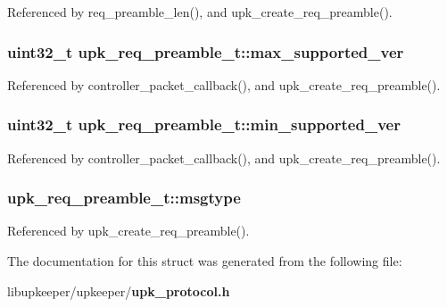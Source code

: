 Referenced by req\_\-preamble\_\-len(), and upk\_\-create\_\-req\_\-preamble().

\subsubsection[{max\_\-supported\_\-ver}]{\setlength{\rightskip}{0pt plus 5cm}uint32\_\-t {\bf upk\_\-req\_\-preamble\_\-t::max\_\-supported\_\-ver}}\label{structupk__req__preamble__t_a229ac56dffaffc07213d4f63d1fc4540}


Referenced by controller\_\-packet\_\-callback(), and upk\_\-create\_\-req\_\-preamble().

\subsubsection[{min\_\-supported\_\-ver}]{\setlength{\rightskip}{0pt plus 5cm}uint32\_\-t {\bf upk\_\-req\_\-preamble\_\-t::min\_\-supported\_\-ver}}\label{structupk__req__preamble__t_a47fb19db9df40e58c4ee3f7027edfdf6}


Referenced by controller\_\-packet\_\-callback(), and upk\_\-create\_\-req\_\-preamble().

\subsubsection[{msgtype}]{ {\bf upk\_\-req\_\-preamble\_\-t::msgtype}}\label{structupk__req__preamble__t_a25327dc25130f88e919e2a728b3d26c5}


Referenced by upk\_\-create\_\-req\_\-preamble().



The documentation for this struct was generated from the following file:\begin{DoxyCompactItemize}
\item 
libupkeeper/upkeeper/{\bf upk\_\-protocol.h}\end{DoxyCompactItemize}

